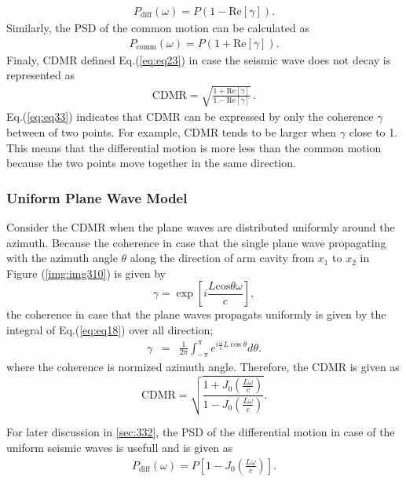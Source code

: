 \begin{eqnarray} \label{eq:eq32}
  P_{\mathrm{diff}}(\omega) = P (1-\mathrm{Re}\left[\gamma\right]).
\end{eqnarray}
Similarly, the PSD of the common motion can be calculated as
\begin{eqnarray}
  P_{\mathrm{comm}}(\omega) = P (1+\mathrm{Re}\left[\gamma\right]).
\end{eqnarray}
Finaly, CDMR defined Eq.(\ref{eq:eq23}) in case the seismic wave does not decay is represented as
\begin{eqnarray}
 \mathrm{CDMR} = \sqrt{\frac{1 + \mathrm{Re} \left[\gamma \right] }{1 - \mathrm{Re} \left[\gamma \right]}}\,. \label{eq:eq33}
\end{eqnarray}
Eq.(\ref{eq:eq33}) indicates that CDMR can be expressed by only the coherence $\gamma$ between of two points. For example, CDMR tends to be larger when $\gamma$ close to 1. This means that the differential motion is more less than the common motion because the two points move together in the same direction.


\subsubsection{Uniform Plane Wave Model}
Consider the CDMR when the plane waves are distributed uniformly around the azimuth. Because the coherence in case that the single plane wave propagating with the azimuth angle $\theta$ along the direction of arm cavity from $x_1$ to $x_2$ in Figure (\ref{img:img310}) is given by
\begin{equation}
  \gamma = \exp\left[{i\frac{L\mathrm{cos}\theta\omega}{c}}\right], \label{eq:eq18}
\end{equation} 
the coherence in case that the plane waves propagats uniformly is given by the integral of Eq.(\ref{eq:eq18}) over all direction;
\begin{eqnarray} \label{eq:eq19}
  \gamma &=& \frac{1}{2\pi} \int_{-\pi}^{\pi} e^{i\frac{\omega}{c} L\cos \theta} d \theta .
\end{eqnarray}
where the coherence is normized azimuth angle. Therefore, the CDMR is given as
\begin{equation}  \label{eq:eq20}
  \mathrm{CDMR} = \sqrt{\frac{1+J_0(\frac{L\omega}{c})}{1-J_0(\frac{L\omega}{c})}} .
\end{equation}

For later discussion in \cref{sec:332}, the PSD of the differential motion in case of the uniform seismic waves is usefull and is given as
\begin{eqnarray} \label{eq:eq21}
  P_{\mathrm{diff}}(\omega) = P \left[1-J_0\left(\frac{L\omega}{c}\right)\right] .
\end{eqnarray}

